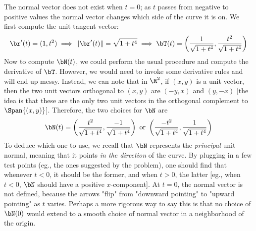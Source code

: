 \begin{enumerate}
{        The normal vector does not exist when $t=0$; as $t$ passes from negative to positive values the normal vector changes which side of the curve it is on.
    }
    {We first compute the unit tangent vector: 
\begin{equation*}
    \br'(t) = (1,t^2) \implies \|\br'(t)\| = \sqrt{1+t^4}\implies \bT(t) = \left(\frac{1}{\sqrt{1+t^4}},\frac{t^2}{\sqrt{1+t^4}}\right)
\end{equation*}
Now to compute $\bN(t)$, we could perform the usual procedure and compute the derivative of $\bT$. However, we would need to invoke some derivative rules and will end up messy. Instead, we can note that in $\R^2$, if $(x,y)$ is a unit vector, then the two unit vectors orthogonal to $(x,y)$ are $(-y,x)$ and $(y,-x)$ [the idea is that these are the only two unit vectors in the orthogonal complement to $\Span\{(x,y)\}$]. Therefore, the two choices for $\bN$ are
\begin{equation*}
    \bN(t) = 
    \left(\frac{t^2}{\sqrt{1+t^4}},\frac{-1}{\sqrt{1+t^4}}\right) 
    \textrm{ or } \left(\frac{-t^2}{\sqrt{1+t^4}},\frac{1}{\sqrt{1+t^4}}\right) 
\end{equation*}
To deduce which one to use, we recall that $\bN$ represents the \textit{principal} unit normal, meaning that it points \textit{in the direction} of the curve. By plugging in a few test points (eg., the ones suggested by the problem), one should find that whenever $t <0$, it should be the former, and when $t>0$, the latter [eg., when $t<0$, $\bN$ should have a positive $x$-component]. At $t=0$, the normal vector is not defined, because the arrows "flip" from "downward pointing" to "upward pointing" as $t$ varies. Perhaps a more rigorous way to say this is that no choice of $\bN(0)$ would extend to a smooth choice of normal vector in a neighborhood of the origin. 
    }
\end{enumerate}

\vspace{-.5cm}
